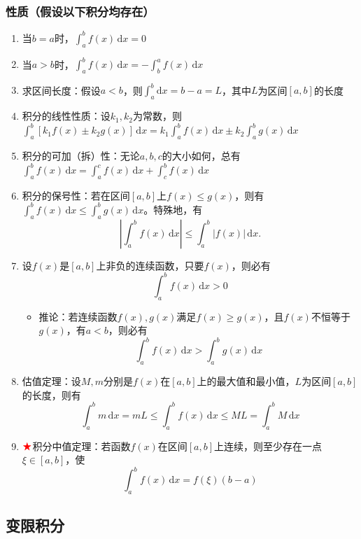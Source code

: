 \documentclass[a4paper,12pt]{article}
\begin{document}
    \subsubsection{性质（假设以下积分均存在）}

    \begin{enumerate}
        \item 当$b = a$时，$\int_a^b f(x)\,\mathrm{d}x = 0$
        \item 当$a > b$时，$\int_a^b f(x)\,\mathrm{d}x = -\int_b^a f(x)\,\mathrm{d}x$
        \item 求区间长度：假设$a<b$，则$\int_a^b \mathrm{d}x = b-a = L$，其中$L$为区间$[a, b]$的长度
        \item 积分的线性性质：设$k_1, k_2$为常数，则$\int_a^b [k_{1}f(x)\pm k_{2}g(x)]\,\mathrm{d}x = k_{1}\int_a^b f(x)\,\mathrm{d}x \pm k_{2}\int_a^b g(x)\,\mathrm{d}x$
        \item 积分的可加（拆）性：无论$a, b, c$的大小如何，总有$\int_a^b f(x)\,\mathrm{d}x = \int_a^c f(x)\,\mathrm{d}x + \int_c^b f(x)\,\mathrm{d}x$
        \item 积分的保号性：若在区间$[a, b]$上$f(x) \leq g(x)$，则有$\int_a^b f(x)\,\mathrm{d}x \leq \int_a^b g(x)\,\mathrm{d}x$。特殊地，有
        \[
            \left| \int_a^b f(x)\,\mathrm{d}x \right|
            \le
            \int_a^b |f(x)|\,\mathrm{d}x.
        \]
        \item 设$f(x)$是$[a, b]$上非负的连续函数，只要$f(x)${\color{red}{不恒等于零}}，则必有
        \[
            \int_a^b f(x)\,\mathrm{d}x > 0
        \]
        \begin{itemize}
            \item 推论：若连续函数$f(x), g(x)$满足$f(x) \geq g(x)$，且$f(x)$不恒等于$g(x)$，有$a < b$，则必有
            \[
                \int_a^b f(x)\,\mathrm{d}x > \int_a^b g(x)\,\mathrm{d}x
            \]
        \end{itemize}
        \item 估值定理：设$M, m$分别是$f(x)$在$[a, b]$上的最大值和最小值，$L$为区间$[a, b]$的长度，则有
        \[
            \int_a^b m\,\mathrm{d}x = mL \leq \int_a^b f(x)\,\mathrm{d}x \leq ML = \int_a^b M\,\mathrm{d}x
        \]
        \item $\color{red}{\bigstar}$积分中值定理：若函数$f(x)$在区间$[a, b]$上连续，则至少存在一点$\xi \in [a, b]$，使
        \[
            \int_a^b f(x)\,\mathrm{d}x = f(\xi)(b - a)
        \]
    \end{enumerate}

    \subsection{变限积分}
\end{document}

